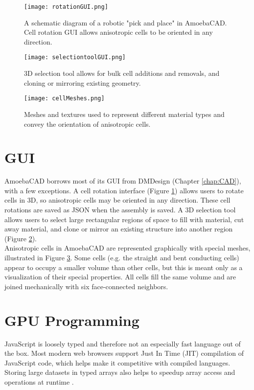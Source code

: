 {\begin{figure}
  \texttt{[image: rotationGUI.png]}
  \caption{A schematic diagram of a robotic "pick and place" in AmoebaCAD.  Cell rotation GUI allows anisotropic cells to be oriented in any direction.}
  \label{fig:rotationGUI}
\end{figure}

\begin{figure}
  \texttt{[image: selectiontoolGUI.png]}
  \caption{3D selection tool allows for bulk cell additions and removals, and cloning or mirroring existing geometry.}
  \label{fig:selectiontoolGUI}
\end{figure}

\begin{figure}
  \texttt{[image: cellMeshes.png]}
  \caption{Meshes and textures used to represent different material types and convey the orientation of anisotropic cells.}
  \label{fig:cellMeshes}
\end{figure}

\section{GUI}

AmoebaCAD borrows most of its GUI from DMDesign (Chapter \ref{chap:CAD}), with a few exceptions.  A cell rotation interface (Figure \ref{fig:rotationGUI}) allows users to rotate cells in 3D, so anisotropic cells may be oriented in any direction.  These cell rotations are saved as JSON when the assembly is saved.  A 3D selection tool allows users to select large rectangular regions of space to fill with material, cut away material, and clone or mirror an existing structure into another region (Figure \ref{fig:selectiontoolGUI}).\\

Anisotropic cells in AmoebaCAD are represented graphically with special meshes, illustrated in Figure \ref{fig:cellMeshes}.  Some cells (e.g. the straight and bent conducting cells) appear to occupy a smaller volume than other cells, but this is meant only as a visualization of their special properties.  All cells fill the same volume and are joined mechanically with six face-connected neighbors.

\section{GPU Programming}

JavaScript is loosely typed and therefore not an especially fast language out of the box.  Most modern web browsers support Just In Time (JIT) compilation of JavaScript code, which helps make it competitive with compiled languages.  Storing large datasets in typed arrays also helps to speedup array access and operations at runtime \cite{Network}.\\

}
